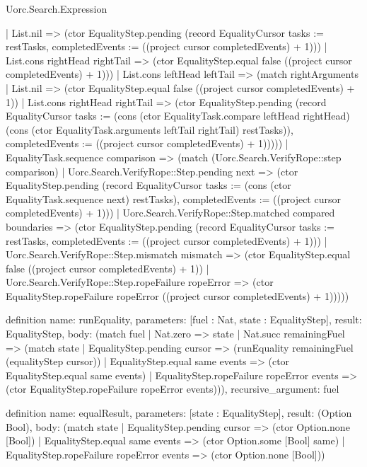 \begin{lexlean}{Uorc.Search.Expression}
\begin{semanticmodule}
{          | List.nil => (ctor EqualityStep.pending (record EqualityCursor {tasks := restTasks, completedEvents := ((project cursor completedEvents) + 1)}))
          | List.cons rightHead rightTail => (ctor EqualityStep.equal false ((project cursor completedEvents) + 1)))
        | List.cons leftHead leftTail => (match rightArguments
          | List.nil => (ctor EqualityStep.equal false ((project cursor completedEvents) + 1))
          | List.cons rightHead rightTail => (ctor EqualityStep.pending (record EqualityCursor {tasks := (cons (ctor EqualityTask.compare leftHead rightHead) (cons (ctor EqualityTask.arguments leftTail rightTail) restTasks)), completedEvents := ((project cursor completedEvents) + 1)}))))
      | EqualityTask.sequence comparison => (match (Uorc.Search.VerifyRope::step comparison)
        | Uorc.Search.VerifyRope::Step.pending next => (ctor EqualityStep.pending (record EqualityCursor {tasks := (cons (ctor EqualityTask.sequence next) restTasks), completedEvents := ((project cursor completedEvents) + 1)}))
        | Uorc.Search.VerifyRope::Step.matched compared boundaries => (ctor EqualityStep.pending (record EqualityCursor {tasks := restTasks, completedEvents := ((project cursor completedEvents) + 1)}))
        | Uorc.Search.VerifyRope::Step.mismatch mismatch => (ctor EqualityStep.equal false ((project cursor completedEvents) + 1))
        | Uorc.Search.VerifyRope::Step.ropeFailure ropeError => (ctor EqualityStep.ropeFailure ropeError ((project cursor completedEvents) + 1)))))
}

definition{
  name: runEquality,
  parameters: [fuel : Nat, state : EqualityStep],
  result: EqualityStep,
  body: (match fuel
    | Nat.zero => state
    | Nat.succ remainingFuel => (match state
      | EqualityStep.pending cursor => (runEquality remainingFuel (equalityStep cursor))
      | EqualityStep.equal same events => (ctor EqualityStep.equal same events)
      | EqualityStep.ropeFailure ropeError events => (ctor EqualityStep.ropeFailure ropeError events))),
  recursive_argument: fuel
}

definition{
  name: equalResult,
  parameters: [state : EqualityStep],
  result: (Option Bool),
  body: (match state
    | EqualityStep.pending cursor => (ctor Option.none [Bool])
    | EqualityStep.equal same events => (ctor Option.some [Bool] same)
    | EqualityStep.ropeFailure ropeError events => (ctor Option.none [Bool]))
}


\end{semanticmodule}
\end{lexlean}
